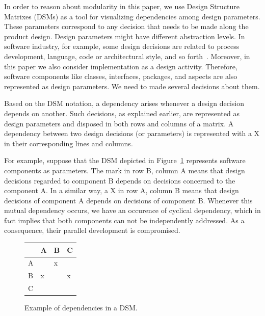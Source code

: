 In order to reason about modularity in this paper, we use Design Structure
Matrixes (DSMs) as a tool for visualizing dependencies among design parameters.
These parameters correspond to any decision that needs to be made along the
product design. Design parameters might have different abstraction levels. In
software industry, for example, some design decisions are related to process
development, language, code or architectural style, and so
forth~\cite{ribeiro-sbes-07}. Moreover, in this paper we also consider
implementation as a design activity. Therefore, software components like
classes, interfaces, packages, and aspects are also represented as design
parameters. We need to made several decisions about them. 

Based on the DSM notation, a dependency arises whenever a design
decision depends on another. Such decisions, as explained earlier, are
represented as design parameters and disposed in both rows and columns of a
matrix. A dependency between two design decisions (or parameters) is represented
with a X in their corresponding lines and columns.

For example, suppose that the DSM depicted in Figure~\ref{dsm:example} represents
software components as parameters. The mark in row B, column A means that design
decisions regarded to component B depends on decisions concerned to the component
A. In a similar way, a X in row A, column B means that design decisions of
component A depends on decisions of component B. Whenever this mutual dependency
occurs, we have an occurence of cyclical dependency, which in fact implies that
both components can not be independently addressed. As a consequence, their
parallel development is compromised.

\begin{figure}[h]
    \begin{center}
           \begin{scriptsize}
            \begin{tabular}{|l|l|l|l|} \hline
                        & A     & B    & C 	\\ \hline
                A      &        &  x    &   	\\ \hline
                B 	&  x    &       &  x 	\\ \hline
                C	&        &       &   	\\ \hline
            \end{tabular}
            \end{scriptsize}
            \label{dsm:example}
        \caption{Example of dependencies in a DSM.}
    \end{center}
\end{figure}

